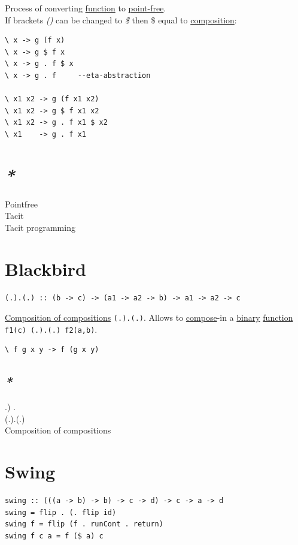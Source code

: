 \documentclass[a4paper,14pt,oneside]{book}
\begin{document}
Process of converting \hyperref[org39271b2]{function} to \hyperref[orga6e657c]{point-free}.\\
If brackets \emph{()} can be changed to \emph{\$} then \$ equal to \hyperref[orgde6ed92]{composition}:\\
\begin{verbatim}
\ x -> g (f x)
\ x -> g $ f x
\ x -> g . f $ x
\ x -> g . f     --eta-abstraction

\ x1 x2 -> g (f x1 x2)
\ x1 x2 -> g $ f x1 x2
\ x1 x2 -> g . f x1 $ x2
\ x1    -> g . f x1
\end{verbatim}

\section{\emph{*}}
\label{sec:org16a56ad}

\label{org9a71ee9}Pointfree\\
\label{org15e860d}Tacit\\
\label{org5845a46}Tacit programming\\

\section{\label{org451c209}Blackbird}
\label{sec:org7ff58aa}
\begin{verbatim}
(.).(.) :: (b -> c) -> (a1 -> a2 -> b) -> a1 -> a2 -> c
\end{verbatim}

\hyperref[orge717dc5]{Composition of compositions} \texttt{(.).(.)}. Allows to \hyperref[org8facb25]{compose}-in a \hyperref[orgd4bd390]{binary} \hyperref[org39271b2]{function} \texttt{f1(c) (.).(.) f2(a,b)}.\\
\begin{verbatim}
\ f g x y -> f (g x y)
\end{verbatim}

\subsection{\emph{*}}
\label{sec:orgf7408b6}

\label{orgc597933}.) .\\
\label{org0e37e8c}(.).(.)\\
\label{orge717dc5}Composition of compositions\\

\section{\label{orgc3c6b86}Swing}
\label{sec:orgb0f75af}
\begin{verbatim}
swing :: (((a -> b) -> b) -> c -> d) -> c -> a -> d
swing = flip . (. flip id)
swing f = flip (f . runCont . return)
swing f c a = f ($ a) c
\end{verbatim}
\end{document}
